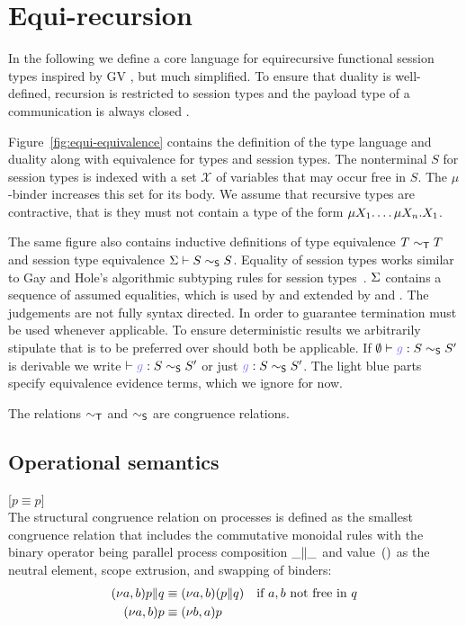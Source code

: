 \section{Equi-recursion}
\label{sec:equi-recursion}


In the following we define a core language for equirecursive
functional session types inspired by GV
\cite{DBLP:journals/jfp/GayV10}, but much simplified. To ensure that
duality is well-defined,
recursion is restricted to session types and the payload type of a
communication is always closed \cite{DBLP:journals/corr/abs-2004-01322}.

Figure~\ref{fig:equi-equivalence} contains the definition of the type language
and duality along with equivalence for types and session types. The nonterminal
$S$ for session types is indexed with a set $\mathcal X$ of variables that may
occur free in $S$. The $\mu$-binder increases this set for its body. We assume
that recursive types are contractive, that is they must not contain a type of
the form $\TRec[X_1]\dots\TRec[X_n]X_1$.

The same figure also contains inductive definitions of type equivalence $T \eqt
T$ and session type equivalence $\eqsctxt \vdash S \eqs S$. Equality of session
types works similar to Gay and Hole's algorithmic subtyping rules for session
types~\cite{DBLP:journals/acta/GayH05}. $\eqsctxt$ contains a sequence of
assumed equalities, which is used by \EqAssump{} and extended by \EqUnrollL{}
and \EqUnrollR{}. The judgements are not fully syntax directed. In order to
guarantee termination \EqAssump{} must be used whenever applicable. To ensure
deterministic results we arbitrarily stipulate that \EqUnrollL{} is to be
preferred over \EqUnrollR{} should both be applicable. If
$\eqsrel[\emptyset]{g}{S}{S'}$ is derivable we write $\eqsrel[]{g}{S}{S'}$ or
just $\convexpr{g} : S \eqs S'$. The light blue parts specify equivalence
evidence terms, which we ignore for now.

\begin{lemma}\label{lemma:congruence}
 The relations $\eqt$ and $\eqs$ are congruence relations.
\end{lemma}



\subsection{Operational semantics}

[$p \equiv p$]\medskip\\
The structural congruence relation on processes is defined as the smallest
congruence relation that includes the commutative monoidal rules with the
binary operator being parallel process composition $\PPar \_ \_$ and
value~$\EUnit$ as the neutral element, scope extrusion, and swapping
of binders:
\begin{align*}
  \PPar{\PScope p}{q} &\equiv \PScope (\PPar p q)
  \quad\text{if $a,b$ not free in $q$}
  \\
  \PScope p &\equiv \PScope[b,a] p
\end{align*}


